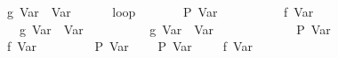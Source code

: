 \begin{isabellebody}
\ \ \ \ {}\ {}\ {}{}\ g\ {}Var\ {}{}\ {}Var\ {}{}\isanewline
\ \ \ \ {}\ loop\isanewline
\ \ \ \ \ \ {}\ {}{}P\ {}Var\ {}{}{}\isanewline
\ \ \ \ \ \ {}\ {}\ {}{}\ f\ {}Var\ {}{}\isanewline
\ \ \ \ \ \ {}\ {}\ {}{}\ g\ {}Var\ {}{}\ {}Var\ {}{}\isanewline
\ \ \ \ \ \ {}\ {}\ {}{}\ g\ {}Var\ {}{}\ {}Var\ {}{}\isanewline
\ \ \ \ \ \ {}\isanewline
\ \ \ \ {}\ P\ {}Var\ {}{}\isanewline
\ \ \ \ {}\ {}\ {}{}\ f\ {}Var\ {}{}\isanewline
\ \ \ \ {}\isanewline
\ \ {}\ P\ {}Var\ {}{}\isanewline
\ \ {}\ {}{}{}P\ {}Var\ {}{}{}\ {}\ {}\ {}{}\ f\ {}Var\ {}{}{}\isanewline

\end{isabellebody}
